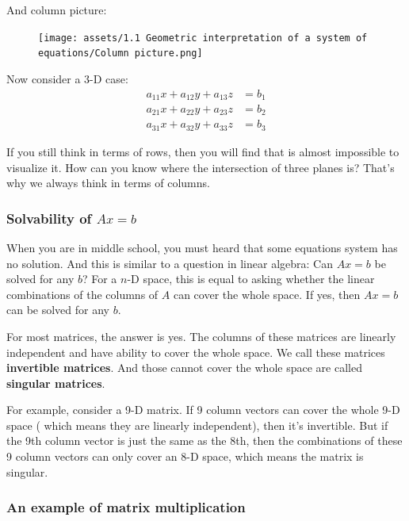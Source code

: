 \documentclass[12pt]{ctexart}
\begin{document}
And column picture:
\begin{figure}[H]
    \centering
    \texttt{[image: assets/1.1 Geometric interpretation of
    a system of equations/Column picture.png]}
\end{figure}

Now consider a 3-D case:
\begin{equation}
    \begin{aligned}
        a_{11}x + a_{12}y + a_{13}z &= b_1 \\
        a_{21}x + a_{22}y + a_{23}z &= b_2 \\
        a_{31}x + a_{32}y + a_{33}z &= b_3
    \end{aligned}
\end{equation}

If you still think in terms of rows, then you will find that is almost impossible to
visualize it. How can you know where the intersection of three planes is? That's why
we always think in terms of columns.

\subsubsection{\textbf{Solvability of $Ax = b$}}

When you are in middle school, you must heard that some equations system has no solution.
And this is similar to a question in linear algebra: Can $Ax = b$ be solved for any $b$?
For a $n$-D space, this is equal to asking whether the linear combinations of the columns of $A$ can
cover the whole space. If yes, then $Ax = b$ can be solved for any $b$.

For most matrices, the answer is yes. The columns of these matrices are linearly
independent and have ability to cover the whole space. We call these matrices
\textbf{invertible matrices}. And those cannot cover the whole space are called
\textbf{singular matrices}. 

For example, consider a 9-D matrix. If 9 column vectors can cover the whole 9-D space (
which means they are linearly independent), then it's invertible. But if the 9th column
vector is just the same as the 8th, then the combinations of these 9 column vectors can
only cover an 8-D space, which means the matrix is singular.

\subsubsection{\textbf{An example of matrix multiplication}}
\end{document}
